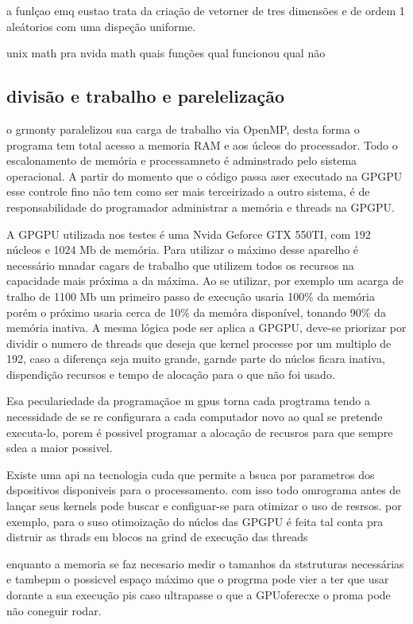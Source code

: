    a funlçao emq eustao trata da criação de vetorner de tres dimensões e de ordem 1 aleátorios com uma dispeção uniforme.

    unix math pra nvida math
    quais funções
      qual funcionou
      qual não

  \subsection{divisão e trabalho e parelelização}
    o grmonty paralelizou sua carga de trabalho via OpenMP, desta forma o programa tem total acesso a memoria RAM e aos úcleos do processador. Todo o escalonamento de memória e processamneto é adminstrado pelo sistema operacional. A partir do momento que o código passa aser executado na GPGPU esse controle fino não tem como ser mais terceirizado a outro sistema, é de responsabilidade do programador administrar a memória e threads na GPGPU.

    A GPGPU utilizada nos testes é uma Nvida Geforce GTX 550TI, com 192 núcleos e 1024 Mb de memória. Para utilizar o máximo desse aparelho é necessário mnadar cagars de trabalho que utilizem todos os recursos na capacidade mais próxima a da máxima. Ao se utilizar, por exemplo um acarga de tralho de 1100 Mb um primeiro passo de execução usaria 100\% da memória porém o próximo usaria cerca de 10\% da memóra disponível, tonando 90\% da memória inativa. A mesma lógica pode ser aplica a GPGPU, deve-se priorizar por dividir o numero de threads que deseja que  kernel processe por um multiplo de 192, caso a diferença seja muito grande, garnde parte do núclos ficara inativa, dispendição recursos e tempo de alocação para o que não foi usado.

    Esa peculariedade da programaçãoe m gpus torna cada progtrama tendo a necessidade de se re configurara a cada computador novo ao qual se pretende executa-lo, porem é possivel programar a alocação de recusros para que sempre sdea a maior possivel.

    Existe uma api na tecnologia cuda que permite a bsuca por parametros dos dspositivos disponiveis para o processamento. com isso todo omrograma antes de lançar seus kernels pode buscar e configuar-se para otimizar o uso de resrsos. por exemplo, para o suso otimoização do núclos das GPGPU é feita tal conta pra distruir as thrads em blocos na grind de execução das threads

    enquanto a memoria se faz necesario medir o tamanhos da ststruturas necessárias e tambepm o possicvel espaço máximo que o progrma pode vier a ter que usar dorante a sua execução pis caso ultrapasse o que a GPUoferecxe o proma pode não coneguir rodar.



